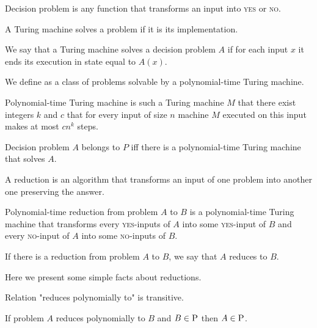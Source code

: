 \begin{defn}
Decision problem is any function that transforms an input into \textsc{yes} or \textsc{no}.
\end{defn}

A Turing machine solves a problem if it is its implementation.

\begin{defn}
We say that a Turing machine solves a decision problem $A$ if for each input $x$
it ends its execution in state equal to $A(x)$.
\end{defn}

We define \p as a class of problems solvable by a polynomial-time Turing machine.

\begin{defn}
Polynomial-time Turing machine is such a Turing machine $M$ that there exist integers $k$ and $c$
that for every input of size $n$ machine $M$ executed on this input makes at most $c n^k$ steps.
\end{defn}

\begin{defn}[\p]
Decision problem $A$ belongs to $P$ iff there is a polynomial-time Turing machine that solves $A$.
\end{defn}

A reduction is an algorithm that transforms an input of one problem into another one
preserving the answer.

\begin{defn}
Polynomial-time reduction from problem $A$ to $B$ is a polynomial-time Turing machine
that transforms every \textsc{yes}-inputs of $A$ into some \textsc{yes}-input of $B$
and every \textsc{no}-input of $A$ into some \textsc{no}-inputs of $B$.
\end{defn}

If there is a reduction from problem $A$ to $B$, we say that $A$ reduces to $B$.

Here we present some simple facts about reductions.

\begin{rmrk}\label{tran-red}
Relation "reduces polynomially to" is transitive.
\end{rmrk}

\begin{rmrk}\label{p-red}
If problem $A$ reduces polynomially to $B$ and $B \in \text{\textsc{P}}$ then $A \in \text{\textsc{P}}$.
\end{rmrk}

